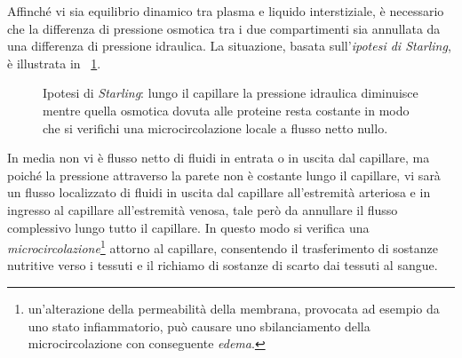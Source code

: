 Affinché vi sia equilibrio dinamico tra plasma e liquido interstiziale, è necessario che la differenza di pressione osmotica tra i due compartimenti sia annullata da una differenza di pressione idraulica. La situazione, basata sull'\textit{ipotesi di Starling}, è illustrata in \figurename~\ref{starling}.
\begin{figure}[htb]
	\centering
		\caption{Ipotesi di \textit{Starling}: lungo il capillare la pressione idraulica diminuisce mentre quella osmotica dovuta alle proteine resta costante in modo che si verifichi una microcircolazione locale a flusso netto nullo.}\label{starling}
\end{figure}
\noindent
In media non vi è flusso netto di fluidi in entrata o in uscita dal capillare, ma poiché la pressione attraverso la parete non è costante lungo il capillare, vi sarà un flusso localizzato di fluidi in uscita dal capillare all'estremità arteriosa e in ingresso al capillare all'estremità venosa, tale però da annullare il flusso complessivo lungo tutto il capillare.
In questo modo si verifica una \textit{microcircolazione}\footnote{un'alterazione della permeabilità della membrana, provocata ad esempio da uno stato infiammatorio, può causare uno sbilanciamento della microcircolazione con conseguente \textit{edema}.} attorno al capillare, consentendo il trasferimento di sostanze nutritive verso i tessuti e il richiamo di sostanze di scarto dai tessuti al sangue.
